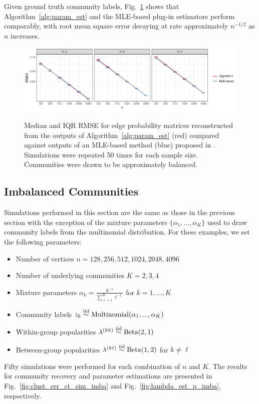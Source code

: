 \documentclass[12pt]{article}
\providecommand{\tightlist}{%
  \setlength{\itemsep}{0pt}\setlength{\parskip}{0pt}}
\begin{document}
Given ground truth community labels, Fig.~\ref{fig:p_block_est} shows
that Algorithm~\ref{alg:param_est} and the MLE-based
plug-in estimators perform comparably, with root mean square
error decaying at rate approximately \(n^{-1/2}\) as $n$ increases.
\begin{figure}[tp]
{\centering \includegraphics{summary_files/figure-latex/lambda_est_p-1}}
\caption{Median and IQR RMSE for edge probability matrices
  reconstructed from the outputs of Algorithm~\ref{alg:param_est}
  (red) compared against outputs of an MLE-based method (blue) proposed in \citet{307cbeb9b1be48299388437423d94bf1}.
  Simulations were repeated 50 times for each sample size. Communities were drawn to be approximately balanced.}
\label{fig:p_block_est}
\end{figure}

\hypertarget{imbalanced-communities}{%
\subsection{Imbalanced Communities}\label{imbalanced-communities}}

Simulations performed in this section are the same as those in the
previous section with the exception of the mixture parameters
\(\{\alpha_1, ..., \alpha_K\}\) used to draw community labels from the
multinomial distribution. For these examples, we set the following
parameters:

\begin{itemize}
\tightlist
\item
  Number of vertices \(n = 128, 256, 512, 1024, 2048, 4096\)
\item
  Number of underlying communities \(K = 2, 3, 4\)
\item
  Mixture parameters \(\alpha_k = \frac{k^{-1}}{\sum_{\ell=1}^K \ell^{-1}}\)
  for \(k = 1, ..., K\)
\item
  Community labels
  \(z_k \stackrel{\text{iid}}{\sim} \mathrm{Multinomial}(\alpha_1, ..., \alpha_K)\)
\item
  Within-group popularities
  \(\lambda^{(kk)} \stackrel{\text{iid}}{\sim} \mathrm{Beta}(2, 1)\)
\item
  Between-group popularities
  \(\lambda^{(k \ell)} \stackrel{\text{iid}}{\sim} \mathrm{Beta}(1, 2)\) for
  \(k \neq \ell\)
\end{itemize}
Fifty simulations were performed for each combination of $n$ and
$K$. The results for community recovery and parameter estimations are
presented in Fig.~\ref{fig:clust_err_ct_sim_imba} and Fig.~\ref{fig:lambda_est_p_imba}, respectively.
\end{document}
